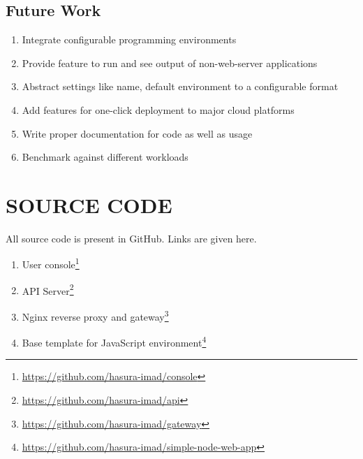 \documentclass[DD]{iitmdiss}
\begin{document}
\section{Future Work}
\begin{enumerate}
	\item Integrate configurable programming environments
	\item Provide feature to run and see output of non-web-server applications
	\item Abstract settings like name, default environment to a configurable format
	\item Add features for one-click deployment to major cloud platforms
	\item Write proper documentation for code as well as usage
	\item Benchmark against different workloads
\end{enumerate}

\appendix

\chapter{SOURCE CODE}

All source code is present in GitHub. Links are given here.
\begin{enumerate}
	\item User console\footnote{\url{https://github.com/hasura-imad/console}}
	\item API Server\footnote{\url{https://github.com/hasura-imad/api}}
	\item Nginx reverse proxy and gateway\footnote{\url{https://github.com/hasura-imad/gateway}}
	\item Base template for JavaScript environment\footnote{\url{https://github.com/hasura-imad/simple-node-web-app}}
\end{enumerate}


\begin{singlespace}
	
\end{singlespace}



%
\end{document}
